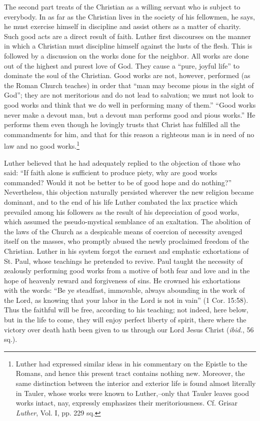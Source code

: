 The second part treats of the Christian as a willing servant who is subject
to everybody. In as far as the Christian lives in the society of his fellowmen,
he says, he must exercise himself in discipline and assist others as a
matter of charity. Such good acts are a direct result of faith. Luther first
discourses on the manner in which a Christian must discipline himself against
the lusts of the flesh. This is followed by a discussion on the works
done for the neighbor. All works are done out of the highest and purest
love of God. They cause a “pure, joyful life” to dominate the soul of the
Christian. Good works are not, however, performed (as the Roman Church
teaches) in order that “man may become pious in the sight of God”; they
are not meritorious and do not lead to salvation; we must not look to good
works and think that we do well in performing many of them.” “Good
works never make a devout man, but a devout man performs good and
pious works.” He performs them even though he lovingly trusts that Christ
has fulfilled all the commandments for him, and that for this reason a
righteous man is in need of no law and no good works.\footnote
{Luther had expressed similar ideas in his commentary on the Epistle to the Romans,
and hence this present tract contains nothing new. Moreover, the same distinction between
the interior and exterior life is found almost literally in Tauler, whose works were known
to Luther,--only that Tauler leaves good works intact, nay, expressly emphasizes their
meritoriousness. Cf. Grisar \textit{Luther}, Vol. I, pp. 229 sq.}

Luther believed that he had adequately replied to the objection of
those who said: “If faith alone is sufficient to produce piety, why are
good works commanded? Would it not be better to be of good hope
and do nothing?” Nevertheless, this objection naturally persisted
wherever the new religion became dominant, and to the end of his
life Luther combated the lax practice which prevailed among his followers
as the result of his depreciation of good works, which assumed
the pseudo-mystical semblance of an exaltation. The abolition of the
laws of the Church as a despicable means of coercion of necessity
avenged itself on the masses, who promptly abused the newly proclaimed
freedom of the Christian. Luther in his system forgot the
earnest and emphatic exhortations of St. Paul, whose teachings he
pretended to revive. Paul taught the necessity of zealously performing
good works from a motive of both fear and love and in the hope
of heavenly reward and forgiveness of sins. He crowned his exhortations
with the words: “Be ye steadfast, immovable, always abounding in the work
of the Lord, as knowing that your labor in the Lord
is not in vain” (1 Cor. 15:58). Thus the faithful will be free, according
to his teaching; not indeed, here below, but in the life to
come, they will enjoy perfect liberty of spirit, there where the victory
over death hath been given to us through our Lord Jesus Christ
(\textit{ibid.}, 56 sq.).

